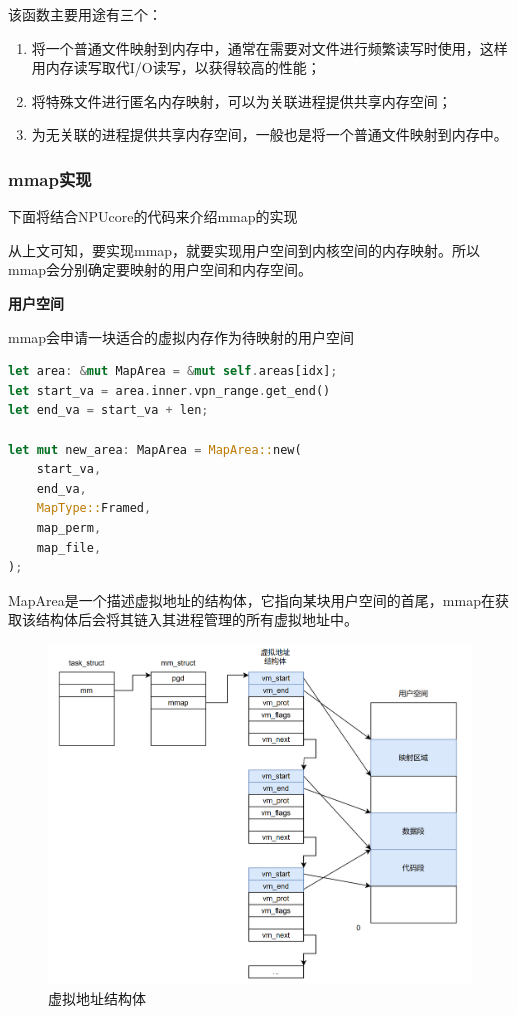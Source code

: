该函数主要用途有三个：
\begin{enumerate}
    \item 将一个普通文件映射到内存中，通常在需要对文件进行频繁读写时使用，这样用内存读写取代I/O读写，以获得较高的性能；
    \item 将特殊文件进行匿名内存映射，可以为关联进程提供共享内存空间；
    \item 为无关联的进程提供共享内存空间，一般也是将一个普通文件映射到内存中。
\end{enumerate}

\subsubsection{mmap实现}
下面将结合NPUcore的代码来介绍mmap的实现

从上文可知，要实现mmap，就要实现用户空间到内核空间的内存映射。所以mmap会分别确定要映射的用户空间和内存空间。

\textbf{用户空间}

mmap会申请一块适合的虚拟内存作为待映射的用户空间
\begin{lstlisting}[language={Rust},
	caption={os/src/mm/memory_set.rs}]
let area: &mut MapArea = &mut self.areas[idx];
let start_va = area.inner.vpn_range.get_end()
let end_va = start_va + len;

let mut new_area: MapArea = MapArea::new(
    start_va,
    end_va,
    MapType::Framed,
    map_perm,
    map_file,
);
\end{lstlisting}
MapArea是一个描述虚拟地址的结构体，它指向某块用户空间的首尾，mmap在获取该结构体后会将其链入其进程管理的所有虚拟地址中。

\begin{figure}[H]
    \centering
    \caption[short]{虚拟地址结构体}
    \includegraphics[width=0.8\linewidth]{figures/09-04-mmap-虚拟地址结构体.png}
\end{figure}

